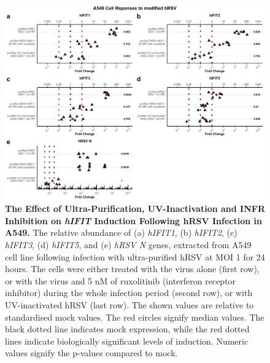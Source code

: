 \begin{figure}
    \centering
    \includegraphics[width=1\linewidth]{06. Chapter 1/Figs/01. Induction/06. a549_hrsv_uv_roxo.pdf}
    \caption[The Effect of Ultra-Purification, UV-Inactivation and INFR Inhibition on \textit{hIFIT} Induction Following hRSV Infection in A549.]{\textbf{The Effect of Ultra-Purification, UV-Inactivation and INFR Inhibition on \textit{hIFIT} Induction Following hRSV Infection in A549.} The relative abundance of (a) \textit{hIFIT1}, (b) \textit{hIFIT2}, (c) \textit{hIFIT3}, (d) \textit{hIFIT5}, and (e) \textit{hRSV N} genes, extracted from A549 cell line following infection with ultra-purified hRSV at MOI 1 for 24 hours. The cells were either treated with the virus alone (first row), or with the virus and 5 nM of ruxolitinib (interferon receptor inhibitor) during the whole infection period (second row), or with UV-inactivated hRSV (last row). The shown values are relative to standardised mock values. The red circles signify median values. The black dotted line indicates mock expression, while the red dotted lines indicate biologically significant levels of induction. Numeric values signify the p-values compared to mock.}
    \label{The effect of ultra-purification, UV-inactivation and INFR inhibition on hIFIT induction following hRSV infection in A549}
\end{figure}

